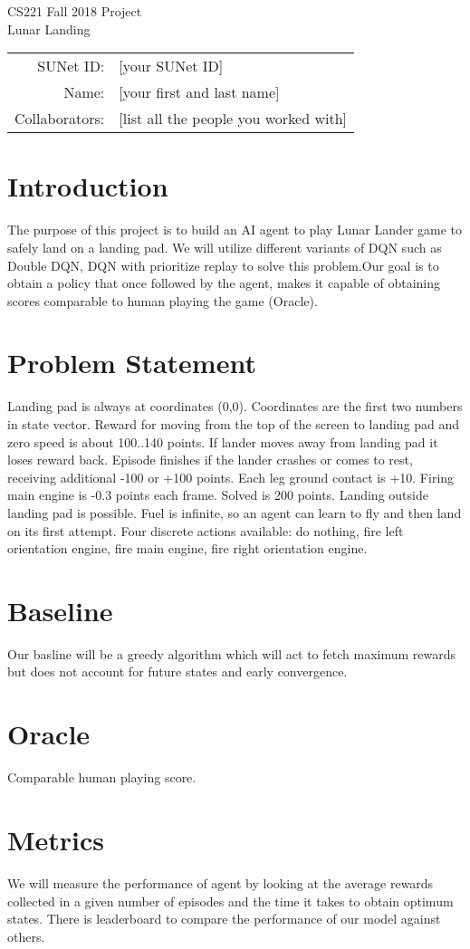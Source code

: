 \documentclass[12pt]{article}
\begin{document}
\begin{center}
{\Large CS221 Fall 2018 Project} \\
{\Large Lunar Landing}

\begin{tabular}{rl}
SUNet ID: & [your SUNet ID] \\
Name: & [your first and last name] \\
Collaborators: & [list all the people you worked with]
\end{tabular}
\end{center}




\section{Introduction}

The purpose of this project is to build an AI agent to play Lunar Lander game to safely land on a landing pad. We will utilize different variants of DQN such as Double DQN, DQN with prioritize replay to solve this problem.Our goal is to obtain a policy that once followed by the agent, makes it capable of obtaining scores comparable to human playing  the game  (Oracle).

\section{Problem Statement}
Landing pad is always at coordinates (0,0). Coordinates are the first two numbers in state vector. Reward for moving from the top of the screen to landing pad and zero speed is about 100..140 points. If lander moves away from landing pad it loses reward back. Episode finishes if the lander crashes or comes to rest, receiving additional -100 or +100 points. Each leg ground contact is +10. Firing main engine is -0.3 points each frame. Solved is 200 points. Landing outside landing pad is possible. Fuel is infinite, so an agent can learn to fly and then land on its first attempt. Four discrete actions available: do nothing, fire left orientation engine, fire main engine, fire right orientation engine.

\section{Baseline}
Our basline will be a greedy algorithm which will act to  fetch maximum rewards but does not account for future states and early convergence.

\section{Oracle}

Comparable human playing score.

\section{Metrics}
We will measure the performance of agent by looking at the average rewards collected in a given number of episodes and the time it takes to obtain optimum states. There is leaderboard to compare the performance of our model against others.
\end{document}
